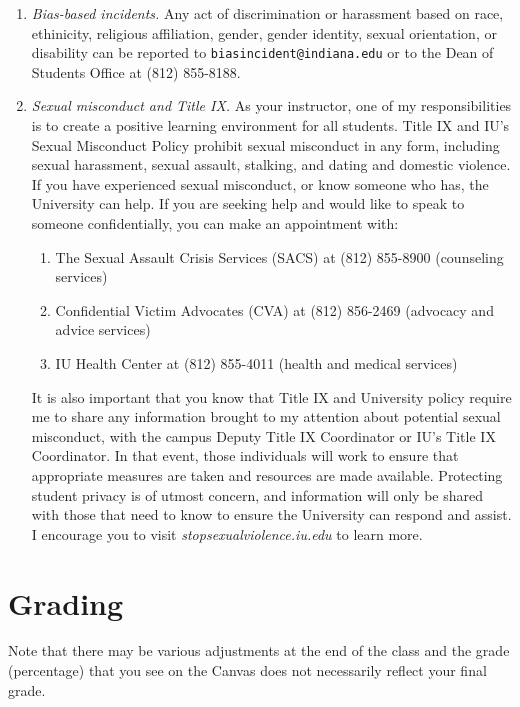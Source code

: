 \documentclass[11pt,article,oneside]{memoir} %
\begin{document}
\begin{enumerate}
\item \emph{Bias-based incidents.} Any act of discrimination or harassment based on 
race, ethinicity, religious affiliation, gender, gender identity, sexual orientation, or
disability can be reported to \texttt{biasincident@indiana.edu} or to the Dean of Students Office at (812) 855-8188. 

\item \emph{Sexual misconduct and Title IX.} As your instructor, one of my
responsibilities is to create a positive learning environment for all students.
Title IX and IU's Sexual Misconduct Policy prohibit sexual misconduct in any
form, including sexual harassment, sexual assault, stalking, and dating and
domestic violence.  If you have experienced sexual misconduct, or know someone
who has, the University can help. If you are seeking help and would like to
speak to someone confidentially, you can make an appointment with:

\begin{enumerate}

\item The Sexual Assault Crisis Services (SACS) at (812) 855-8900 (counseling services)
\item Confidential Victim Advocates (CVA) at (812) 856-2469 (advocacy and advice services)
\item IU Health Center at (812) 855-4011 (health and medical services)

\end{enumerate}

It is also important that you know that Title IX and University policy require
me to share any information brought to my attention about potential sexual
misconduct, with the campus Deputy Title IX Coordinator or IU's Title IX
Coordinator. In that event, those individuals will work to ensure that
appropriate measures are taken and resources are made available. Protecting
student privacy is of utmost concern, and information will only be shared with
those that need to know to ensure the University can respond and assist. I
encourage you to visit \emph{stopsexualviolence.iu.edu} to learn more.


\end{enumerate}
\section{Grading}\label{sec:grading_tentative_} %

Note that there may be various adjustments at the end of the class and the grade (percentage) that you see on the Canvas does not necessarily reflect your final grade.
\end{document}
